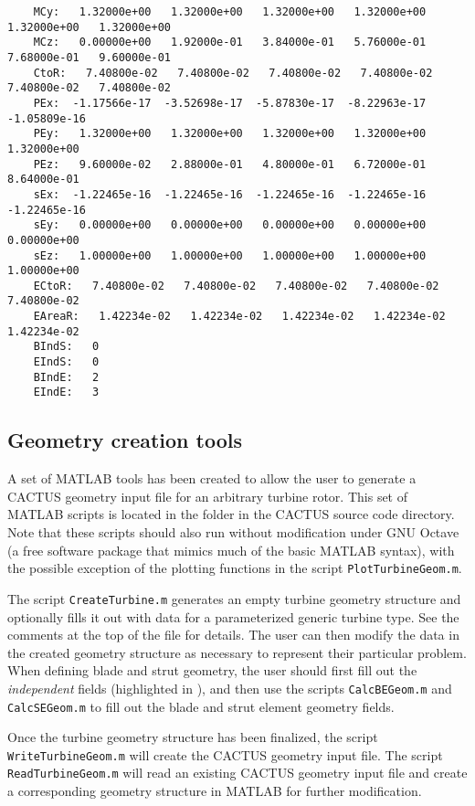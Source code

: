 \begin{lstlisting}
    MCy:   1.32000e+00   1.32000e+00   1.32000e+00   1.32000e+00   1.32000e+00   1.32000e+00 
    MCz:   0.00000e+00   1.92000e-01   3.84000e-01   5.76000e-01   7.68000e-01   9.60000e-01 
    CtoR:   7.40800e-02   7.40800e-02   7.40800e-02   7.40800e-02   7.40800e-02   7.40800e-02 
    PEx:  -1.17566e-17  -3.52698e-17  -5.87830e-17  -8.22963e-17  -1.05809e-16 
    PEy:   1.32000e+00   1.32000e+00   1.32000e+00   1.32000e+00   1.32000e+00 
    PEz:   9.60000e-02   2.88000e-01   4.80000e-01   6.72000e-01   8.64000e-01 
    sEx:  -1.22465e-16  -1.22465e-16  -1.22465e-16  -1.22465e-16  -1.22465e-16 
    sEy:   0.00000e+00   0.00000e+00   0.00000e+00   0.00000e+00   0.00000e+00 
    sEz:   1.00000e+00   1.00000e+00   1.00000e+00   1.00000e+00   1.00000e+00 
    ECtoR:   7.40800e-02   7.40800e-02   7.40800e-02   7.40800e-02   7.40800e-02 
    EAreaR:   1.42234e-02   1.42234e-02   1.42234e-02   1.42234e-02   1.42234e-02 
    BIndS:   0 
    EIndS:   0 
    BIndE:   2 
    EIndE:   3
\end{lstlisting}

\subsection{Geometry creation tools}
\label{sec:geomery_creation_tools}
A set of MATLAB tools has been created to allow the user to generate a CACTUS geometry input file for an arbitrary turbine rotor. This set of MATLAB scripts is located in the  folder in the CACTUS source code directory. Note that these scripts should also run without modification under GNU Octave (a free software package that mimics much of the basic MATLAB syntax), with the possible exception of the plotting functions in the script \texttt{PlotTurbineGeom.m}.

The script \texttt{CreateTurbine.m} generates an empty turbine geometry structure and optionally fills it out with data for a parameterized generic turbine type. See the comments at the top of the file for details. The user can then modify the data in the created geometry structure as necessary to represent their particular problem. When defining blade and strut geometry, the user should first fill out the \emph{independent} fields (highlighted in ), and then use the scripts \texttt{CalcBEGeom.m} and \texttt{CalcSEGeom.m} to fill out the blade and strut element geometry fields.

Once the turbine geometry structure has been finalized, the script \texttt{WriteTurbineGeom.m} will create the CACTUS geometry input file. The script \texttt{ReadTurbineGeom.m} will read an existing CACTUS geometry input file and create a corresponding geometry structure in MATLAB for further modification.

